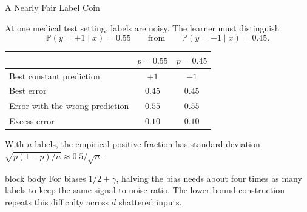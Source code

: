 \documentclass[aspectratio=169,10pt]{beamer}
\newcommand{\Prb}{\mathbb{P}}
\newcommand{\KeyBox}[1]{%
  \begin{beamercolorbox}[rounded=true,sep=0.22cm,wd=\linewidth]{block body}
    #1
  \end{beamercolorbox}%
}
\begin{document}
\begin{frame}[t]{A Nearly Fair Label Coin}
  \vspace{0.04cm}
  \small

  At one medical test setting, labels are noisy. The learner must distinguish
  \[
    \Prb(y=+1\mid x)=0.55
    \qquad\text{from}\qquad
    \Prb(y=+1\mid x)=0.45.
  \]
  \begin{center}
  \renewcommand{\arraystretch}{1.15}
  \begin{tabular}{lcc}
    \toprule
    & $p=0.55$ & $p=0.45$\\
    \midrule
    Best constant prediction & $+1$ & $-1$\\
    Best error & $0.45$ & $0.45$\\
    Error with the wrong prediction & $0.55$ & $0.55$\\
    Excess error & $0.10$ & $0.10$\\
    \bottomrule
  \end{tabular}
  \end{center}
  With $n$ labels, the empirical positive fraction has standard deviation
  $\sqrt{p(1-p)/n}\approx0.5/\sqrt n$.
  \vspace{0.16cm}
  \KeyBox{For biases $1/2\pm\gamma$, halving the bias needs about four times
  as many labels to keep the same signal-to-noise ratio. The lower-bound
  construction repeats this difficulty across $d$ shattered inputs.}

\end{frame}
\end{document}
